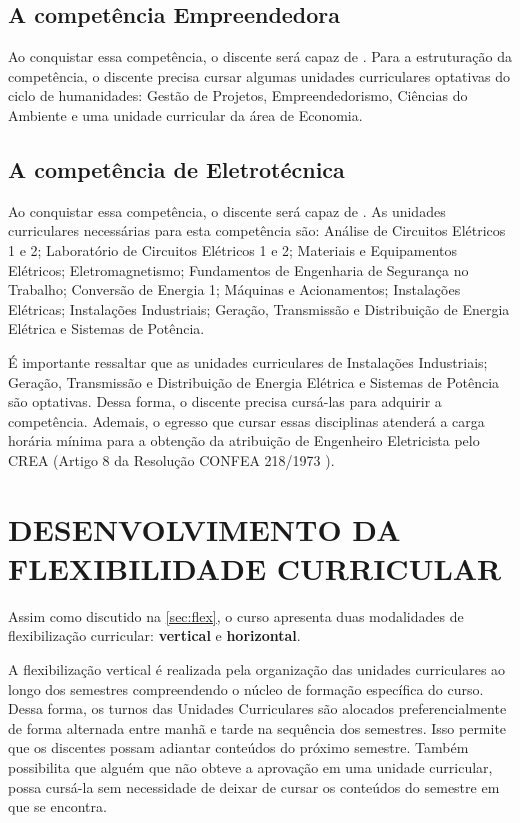 \subsection{A competência Empreendedora}

Ao conquistar essa competência, o discente será capaz de \textbf{\compEmp}. Para a estruturação da competência, o discente precisa cursar algumas unidades curriculares optativas do ciclo de humanidades: Gestão de Projetos, Empreendedorismo, Ciências do Ambiente e uma unidade curricular da área de Economia.

\subsection{A competência de Eletrotécnica}

Ao conquistar essa competência, o discente será capaz de \textbf{\compEle}. As unidades curriculares necessárias para esta competência são: Análise de Circuitos Elétricos 1 e 2; Laboratório de Circuitos Elétricos 1 e 2; Materiais e Equipamentos Elétricos; Eletromagnetismo; Fundamentos de Engenharia de Segurança no Trabalho; Conversão de Energia 1; Máquinas e Acionamentos; Instalações Elétricas; Instalações Industriais; Geração, Transmissão e Distribuição de Energia Elétrica e Sistemas de Potência.

É importante ressaltar que as unidades curriculares de Instalações Industriais; Geração, Transmissão e Distribuição de Energia Elétrica e Sistemas de Potência são optativas. Dessa forma, o discente precisa cursá-las para adquirir a competência. Ademais, o egresso que cursar essas disciplinas atenderá a carga horária mínima para a obtenção da atribuição de Engenheiro Eletricista pelo CREA (Artigo 8\textordmasculine{} da Resolução CONFEA 218/1973 \cite{confea1973}).

\section{DESENVOLVIMENTO DA FLEXIBILIDADE CURRICULAR}

Assim como discutido na \autoref{sec:flex}, o curso apresenta duas modalidades de flexibilização curricular: \textbf{vertical} e \textbf{horizontal}. 

A flexibilização vertical é realizada pela organização das unidades curriculares ao longo dos semestres compreendendo o núcleo de formação específica do curso. Dessa forma, os turnos das Unidades Curriculares são alocados preferencialmente de forma alternada entre manhã e tarde na sequência dos semestres. Isso permite que os discentes possam adiantar conteúdos do próximo semestre. Também possibilita que alguém que não obteve a aprovação em uma unidade curricular, possa cursá-la sem necessidade de deixar de cursar os conteúdos do semestre em que se encontra.

